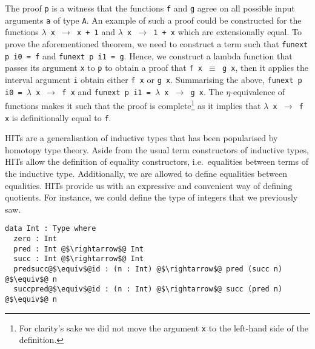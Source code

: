 \documentclass[12pt,twoside,maitrise]{dms}
\theoremstyle{definition}
\numberwithin{equation}{section}
\numberwithin{table}{chapter}
\numberwithin{figure}{chapter}
\newcommand\id[1] {\texttt{#1}}
\newcommand\fn[1] {\texttt{#1}}
\begin{document}
The proof \id{p} is a witness that the functions \id{f} and \id{g} agree on all
possible input arguments \id{a} of type \id{A}. An example of such a proof could
be constructed for the functions \fn{$\lambda$ x $\rightarrow$ x + 1} and
\fn{$\lambda$ x $\rightarrow$ 1 + x} which are extensionally equal. To prove the
aforementioned theorem, we need to construct a term such that \fn{funext p i0 =
  f} and \fn{funext p i1 = g}. Hence, we construct a lambda function that passes
its argument \id{x} to \id{p} to obtain a proof that \fn{f x $\equiv$ g x}, then
it applies the interval argument \id{i} obtain either \fn{f x} or \fn{g x}.
Summarising the above, \fn{funext p i0 = $\lambda$ x $\rightarrow$ f x} and
\fn{funext p i1 = $\lambda$ x $\rightarrow$ g x}. The $\eta$-equivalence of
functions makes it such that the proof is complete\footnote{For clarity's sake
we did not move the argument \id{x} to the left-hand side of the definition.} as
it implies that \fn{$\lambda$ x $\rightarrow$ f x} is definitionally equal to
\id{f}.



HITs are a generalisation of inductive types that has been popularised by
homotopy type theory\cite{HoTTbook}. Aside from the usual term constructors of
inductive types, HITs allow the definition of equality constructors,
i.e.\ equalities between terms of the inductive type. Additionally, we are
allowed to define equalities between equalities. HITs provide us with an
expressive and convenient way of defining quotients. For instance, we could
define the type of integers that we previously saw.

\begin{verbatim}
data Int : Type where
  zero : Int
  pred : Int @$\rightarrow$@ Int
  succ : Int @$\rightarrow$@ Int
  predsucc@$\equiv$@id : (n : Int) @$\rightarrow$@ pred (succ n) @$\equiv$@ n
  succpred@$\equiv$@id : (n : Int) @$\rightarrow$@ succ (pred n) @$\equiv$@ n
\end{verbatim}
\end{document}
